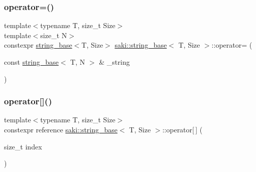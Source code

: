 \subsubsection{\texorpdfstring{operator=()}{operator=()}\hspace{0.1cm}{\footnotesize\ttfamily [2/2]}}
{\footnotesize\ttfamily template$<$typename T, size\+\_\+t Size$>$ \\
template$<$size\+\_\+t N$>$ \\
constexpr \mbox{\hyperlink{classsaki_1_1string__base}{string\+\_\+base}}$<$T, Size$>$ \mbox{\hyperlink{classsaki_1_1string__base}{saki\+::string\+\_\+base}}$<$ T, Size $>$\+::operator= (\begin{DoxyParamCaption}\item[{const \mbox{\hyperlink{classsaki_1_1string__base}{string\+\_\+base}}$<$ T, N $>$ \&}]{\+\_\+string }\end{DoxyParamCaption})\hspace{0.3cm}{\ttfamily [inline]}}

\mbox{\label{classsaki_1_1string__base_acd4fb28d0f27242ecc038bab75018f3d}} 
\subsubsection{\texorpdfstring{operator[]()}{operator[]()}\hspace{0.1cm}{\footnotesize\ttfamily [1/2]}}
{\footnotesize\ttfamily template$<$typename T, size\+\_\+t Size$>$ \\
constexpr reference \mbox{\hyperlink{classsaki_1_1string__base}{saki\+::string\+\_\+base}}$<$ T, Size $>$\+::operator\mbox{[}$\,$\mbox{]} (\begin{DoxyParamCaption}\item[{size\+\_\+t}]{index }\end{DoxyParamCaption})\hspace{0.3cm}{\ttfamily [inline]}}

\mbox{\label{classsaki_1_1string__base_a738a15596baa6e6ade3322ce5dea9bea}} 
